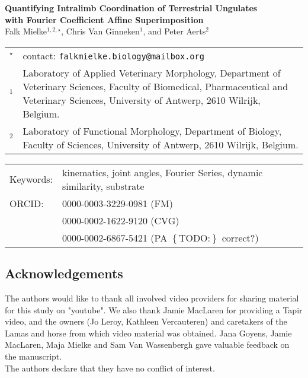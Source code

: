 \documentclass[10pt, a4paper]{article}
\newcommand{\todo}[1]{\colorbox{terracotta!30!yellow}{\footnotesize{$\left\lbrace\text{TODO:}\right\rbrace$ }#1\normalsize}}
\begin{document}
\setcounter{page}{1}

\thispagestyle{fancy} %





\begin{center}
\large{\textbf{Quantifying Intralimb Coordination of Terrestrial Ungulates \\with Fourier Coefficient Affine Superimposition}}
\smallskip\\\textsf{Falk Mielke$^{1,2,\star}$, Chris Van Ginneken$^{1}$, and Peter Aerts$^{2}$}
\end{center}


\vspace*{0.cm}
\begin{tabular}{ r  p{}}
$^{\star}$ & contact: \nolinkurl{falkmielke.biology@mailbox.org}
\\ $^{1}$ & Laboratory of Applied Veterinary Morphology, Department of Veterinary Sciences, Faculty of Biomedical, Pharmaceutical and Veterinary Sciences, University of Antwerp, 2610 Wilrijk, Belgium.
\\ $^{2}$ & Laboratory of Functional Morphology, Department of Biology, Faculty of Sciences, University of Antwerp, 2610 Wilrijk, Belgium.
\end{tabular}


\vspace*{0.cm}
\begin{tabular}{p{} p{}}
Keywords: & kinematics, joint angles, Fourier Series, dynamic similarity, substrate
\\ ORCID: & 0000-0003-3229-0981 (FM)
\\		  & 0000-0002-1622-9120 (CVG)
\\		  & 0000-0002-6867-5421 (PA \todo{correct?})

\end{tabular}

\subsection*{Acknowledgements}
The authors would like to thank all involved video providers for sharing material for this study on "youtube". 
We also thank Jamie MacLaren for providing a Tapir video, and the owners (Jo Leroy, Kathleen Vercauteren) and caretakers of the Lamas and horse from which video material was obtained. 
Jana Goyens, Jamie MacLaren, Maja Mielke and Sam Van Wassenbergh gave valuable feedback on the manuscript.  
\bigskip\\
The authors declare that they have no conflict of interest.
\end{document}
